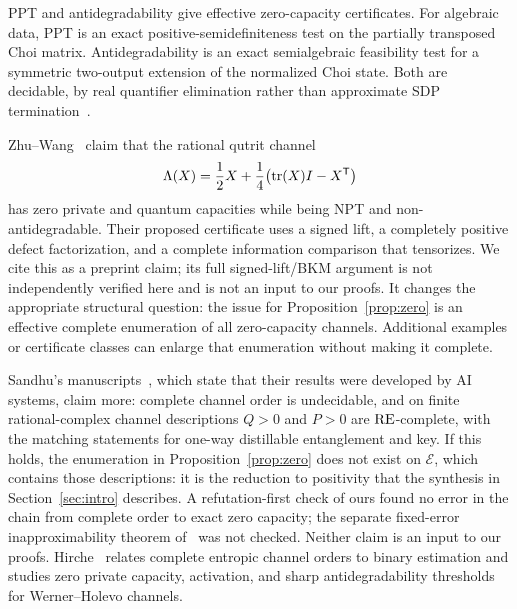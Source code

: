 \begin{remark}
PPT and antidegradability give effective zero-capacity certificates.
For algebraic data, PPT is an exact positive-semidefiniteness test on the
partially transposed Choi matrix. Antidegradability is an exact
semialgebraic feasibility test for a symmetric two-output extension of
the normalized Choi state. Both are decidable, by real quantifier
elimination rather than approximate SDP termination~\cite{WCPG}.

Zhu--Wang~\cite[Theorems~1.1 and 4.3; Section~5]{ZW} claim that the
rational qutrit channel
\[
 \Lambda(X)=\frac12X+\frac14\bigl(\operatorname{tr}(X)I-X^{\mathsf T}\bigr)
\]
has zero private and quantum capacities while being NPT and
non-antidegradable. Their proposed certificate uses a signed lift,
a completely positive defect factorization, and a complete information
comparison that tensorizes. We cite this as a preprint claim; its full
signed-lift/BKM argument is not independently verified here and is not
an input to our proofs. It changes the appropriate structural question:
the issue for Proposition~\ref{prop:zero} is an effective complete
enumeration of all zero-capacity channels. Additional examples or
certificate classes can enlarge that enumeration without making it
complete.

Sandhu's manuscripts~\cite{SandhuOrder,SandhuCapacity}, which state that
their results were developed by AI systems, claim more: complete channel
order is undecidable, and on finite rational-complex channel descriptions
$Q>0$ and $P>0$ are $\mathrm{RE}$-complete, with the matching statements for
one-way distillable entanglement and key. If this holds, the enumeration
in Proposition~\ref{prop:zero} does not exist on $\mathcal E$, which
contains those descriptions: it is the reduction to positivity that the
synthesis in Section~\ref{sec:intro} describes. A refutation-first check
of ours found no error in the chain from complete order to exact zero
capacity; the separate fixed-error inapproximability theorem
of~\cite{SandhuOrder} was not checked. Neither claim is an input to our
proofs. Hirche~\cite{Hirche} relates complete entropic channel orders to
binary estimation and studies zero private capacity, activation, and
sharp antidegradability thresholds for Werner--Holevo channels.
\end{remark}

